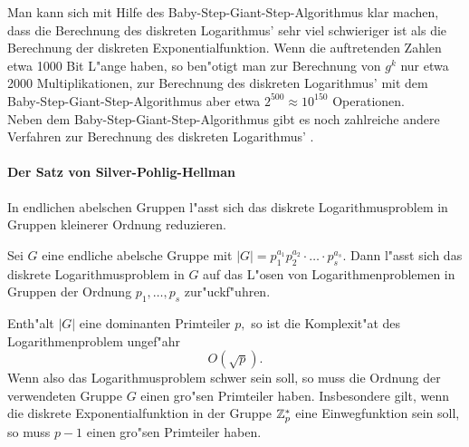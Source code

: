 Man kann sich mit Hilfe des Baby-Step-Giant-Step-Algorithmus klar machen, dass die Berechnung des diskreten Logarithmus' sehr viel schwieriger ist als die Berechnung der diskreten Exponentialfunktion. Wenn die auftretenden Zahlen etwa 1000 Bit L"ange haben, so ben"otigt man zur Berechnung von $ g^k $ nur etwa 2000 Multiplikationen, zur Berechnung des diskreten Logarithmus' mit dem Baby-Step-Giant-Step-Algorithmus aber etwa $ 2^{500} \approx 10^{150} $ Operationen. \\
Neben dem Baby-Step-Giant-Step-Algorithmus gibt es noch zahlreiche andere Verfahren zur Berechnung des diskreten Logarithmus' \cite{Stinson1995}.

\paragraph{Der Satz von Silver-Pohlig-Hellman}
In endlichen abelschen Gruppen l"asst sich das  diskrete Logarithmusproblem in Gruppen kleinerer Ordnung reduzieren.
\begin{satz}\label{thm-cry-pohe}
Sei $ G $ eine endliche abelsche Gruppe mit $ |G|= p_1^{a_1} p_2^{a_2} \cdot \ldots \cdot p_s^{a_s}. $ Dann l"asst sich das diskrete Logarithmusproblem in $ G $ auf das L"osen von Logarithmenproblemen in Gruppen der Ordnung $ p_1, \ldots , p_s $ zur"uckf"uhren.
\end{satz}

Enth"alt $ |G| $ eine \glqq dominanten\grqq {} Primteiler $ p ,$ so ist die Komplexit"at  des Logarithmenproblem ungef"ahr
\[ O(\sqrt{p}). \]
Wenn also das Logarithmusproblem schwer sein soll, so muss die Ordnung der verwendeten Gruppe $ G $ einen gro"sen Primteiler haben. Insbesondere gilt, wenn die diskrete Exponentialfunktion in der Gruppe $ \mathbf{\mathbb{Z}}_p^{\ast} $ eine Einwegfunktion sein soll, so muss $ p -1 $ einen gro"sen Primteiler haben.


\begin{center}
\end{center}


